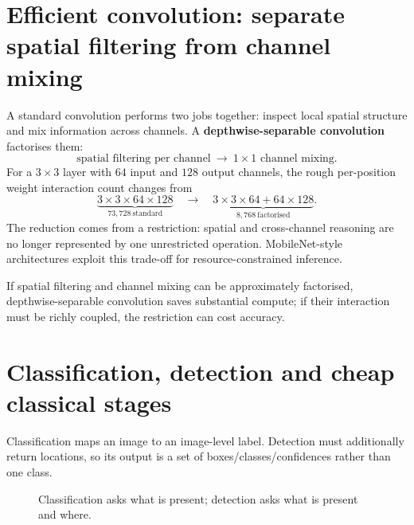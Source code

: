 \section{Efficient convolution: separate spatial filtering from channel mixing}
\label{sec:cnn-depthwise-separable}
A standard convolution performs two jobs together: inspect local spatial structure and mix information across channels.
A \textbf{depthwise-separable convolution} factorises them:
\[
\boxed{
\text{spatial filtering per channel}
\ \longrightarrow\
\text{$1\times1$ channel mixing}
}.
\]
For a $3\times3$ layer with $64$ input and $128$ output channels, the rough per-position weight interaction count changes from
\[
\underbrace{3\times3\times64\times128}_{73{,}728\ \text{standard}}
\quad\longrightarrow\quad
\underbrace{3\times3\times64+64\times128}_{8{,}768\ \text{factorised}}.
\]
The reduction comes from a restriction: spatial and cross-channel reasoning are no longer represented by one unrestricted operation.
MobileNet-style architectures exploit this trade-off for resource-constrained inference.

\begin{calloutbias}
If spatial filtering and channel mixing can be approximately factorised, depthwise-separable convolution saves substantial compute; if their interaction must be richly coupled, the restriction can cost accuracy.
\end{calloutbias}

\section{Classification, detection and cheap classical stages}
\label{sec:cnn-classification-detection}
Classification maps an image to an image-level label.
Detection must additionally return locations, so its output is a set of boxes/classes/confidences rather than one class.

\begin{figure}[htbp]
\centering
{}
\caption{Classification asks what is present; detection asks what is present and where.}
\end{figure}

